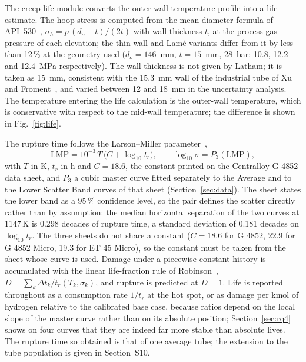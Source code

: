 \documentclass[final,3p,times]{elsarticle}
\begin{document}
The creep-life module converts the outer-wall temperature profile into a life estimate. The hoop stress is computed from the mean-diameter formula of API~530~\cite{api530}, $\sigma_h = p\,(d_o - t)/(2t)$ with wall thickness $t$, at the process-gas pressure of each elevation; the thin-wall and Lam\'e variants differ from it by less than 12\,\% at the geometry used ($d_o = 146$~mm, $t = 15$~mm, 28~bar: 10.8, 12.2 and 12.4~MPa respectively). The wall thickness is not given by Latham; it is taken as 15~mm, consistent with the 15.3~mm wall of the industrial tube of Xu and Froment~\cite{xu1989b}, and varied between 12 and 18~mm in the uncertainty analysis. The temperature entering the life calculation is the outer-wall temperature, which is conservative with respect to the mid-wall temperature; the difference is shown in Fig.~\ref{fig:life}.

The rupture time follows the Larson--Miller parameter~\cite{larson1952},
\begin{equation}
\mathrm{LMP} = 10^{-3}\,T\,\big(C + \log_{10} t_r\big), \qquad \log_{10}\sigma = P_3(\mathrm{LMP}),
\label{eq:lmp}
\end{equation}
with $T$ in K, $t_r$ in h and $C = 18.6$, the constant printed on the Centralloy G 4852 data sheet, and $P_3$ a cubic master curve fitted separately to the Average and to the Lower Scatter Band curves of that sheet (Section~\ref{sec:data}). The sheet states the lower band as a 95\,\% confidence level, so the pair defines the scatter directly rather than by assumption: the median horizontal separation of the two curves at 1147\,K is 0.298 decades of rupture time, a standard deviation of 0.181 decades on $\log_{10} t_r$. The three sheets do not share a constant ($C = 18.6$ for G 4852, 22.9 for G 4852 Micro, 19.3 for ET 45 Micro), so the constant must be taken from the sheet whose curve is used. Damage under a piecewise-constant history is accumulated with the linear life-fraction rule of Robinson~\cite{robinson1952}, $D = \sum_k \Delta t_k / t_r(T_k, \sigma_k)$, and rupture is predicted at $D = 1$. Life is reported throughout as a consumption rate $1/t_r$ at the hot spot, or as damage per kmol of hydrogen relative to the calibrated base case, because ratios depend on the local slope of the master curve rather than on its absolute position; Section~\ref{sec:rq4} shows on four curves that they are indeed far more stable than absolute lives. The rupture time so obtained is that of one average tube; the extension to the tube population is given in Section~S10.
\end{document}
